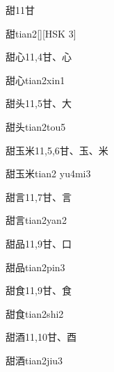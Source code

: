 \begin{Entry}{甜}{11}{⽢}
  \begin{Phonetics}{甜}{tian2}[][HSK 3]
  \end{Phonetics}
\end{Entry}

\begin{Entry}{甜心}{11,4}{⽢、⼼}
  \begin{Phonetics}{甜心}{tian2xin1}
  \end{Phonetics}
\end{Entry}

\begin{Entry}{甜头}{11,5}{⽢、⼤}
  \begin{Phonetics}{甜头}{tian2tou5}
  \end{Phonetics}
\end{Entry}

\begin{Entry}{甜玉米}{11,5,6}{⽢、⽟、⽶}
  \begin{Phonetics}{甜玉米}{tian2 yu4mi3}
  \end{Phonetics}
\end{Entry}

\begin{Entry}{甜言}{11,7}{⽢、⾔}
  \begin{Phonetics}{甜言}{tian2yan2}
  \end{Phonetics}
\end{Entry}

\begin{Entry}{甜品}{11,9}{⽢、⼝}
  \begin{Phonetics}{甜品}{tian2pin3}
  \end{Phonetics}
\end{Entry}

\begin{Entry}{甜食}{11,9}{⽢、⾷}
  \begin{Phonetics}{甜食}{tian2shi2}
  \end{Phonetics}
\end{Entry}

\begin{Entry}{甜酒}{11,10}{⽢、⾣}
  \begin{Phonetics}{甜酒}{tian2jiu3}
  \end{Phonetics}
\end{Entry}

